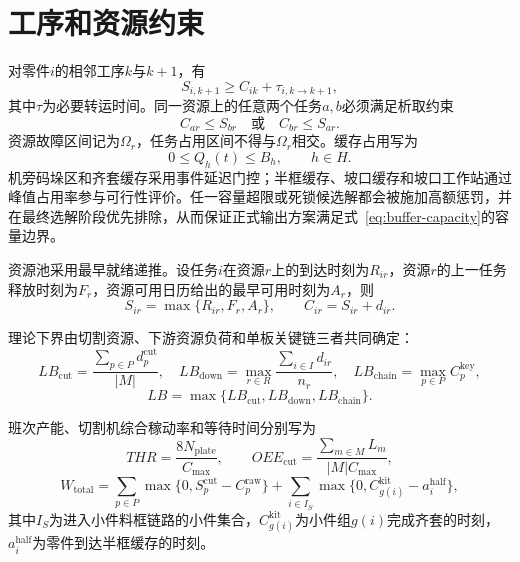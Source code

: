 \documentclass[UTF8,zihao=-4,openany]{ctexrep}
\begin{document}
\section{工序和资源约束}

对零件$i$的相邻工序$k$与$k+1$，有
\begin{equation}
 S_{i,k+1}\ge C_{ik}+\tau_{i,k\rightarrow k+1},
\end{equation}
其中$\tau$为必要转运时间。同一资源上的任意两个任务$a,b$必须满足析取约束
\begin{equation}
 C_{ar}\le S_{br}\quad\text{或}\quad C_{br}\le S_{ar}.
\end{equation}
资源故障区间记为$\Omega_r$，任务占用区间不得与$\Omega_r$相交。缓存占用写为
\begin{equation}
 0\le Q_h(t)\le B_h,\qquad h\in H.\label{eq:buffer-capacity}
\end{equation}
机旁码垛区和齐套缓存采用事件延迟门控；半框缓存、坡口缓存和坡口工作站通过峰值占用率参与可行性评价。任一容量超限或死锁候选解都会被施加高额惩罚，并在最终选解阶段优先排除，从而保证正式输出方案满足式~\eqref{eq:buffer-capacity}的容量边界。

资源池采用最早就绪递推。设任务$i$在资源$r$上的到达时刻为$R_{ir}$，资源$r$的上一任务释放时刻为$F_r$，资源可用日历给出的最早可用时刻为$A_r$，则
\begin{equation}
 S_{ir}=\max\{R_{ir},F_r,A_r\},\qquad C_{ir}=S_{ir}+d_{ir}.
\end{equation}

理论下界由切割资源、下游资源负荷和单板关键链三者共同确定：
\begin{equation}
 LB_{\mathrm{cut}}=\frac{\sum_{p\in P}d_p^{\mathrm{cut}}}{|M|},
 \quad
 LB_{\mathrm{down}}=\max_{r\in R}\frac{\sum_{i\in I}d_{ir}}{n_r},
 \quad
 LB_{\mathrm{chain}}=\max_{p\in P}C_p^{\mathrm{key}},
\end{equation}
\begin{equation}
 LB=\max\{LB_{\mathrm{cut}},LB_{\mathrm{down}},LB_{\mathrm{chain}}\}.
\end{equation}

班次产能、切割机综合稼动率和等待时间分别写为
\begin{equation}
 THR=\frac{8N_{\mathrm{plate}}}{C_{\max}},
 \qquad
 OEE_{\mathrm{cut}}=\frac{\sum_{m\in M}L_m}{|M|C_{\max}},
\end{equation}
\begin{equation}
 W_{\mathrm{total}}
 =\sum_{p\in P}\max\{0,S_p^{\mathrm{cut}}-C_p^{\mathrm{raw}}\}
 +\sum_{i\in I_S}\max\{0,C_{g(i)}^{\mathrm{kit}}-a_i^{\mathrm{half}}\},
\end{equation}
其中$I_S$为进入小件料框链路的小件集合，$C_{g(i)}^{\mathrm{kit}}$为小件组$g(i)$完成齐套的时刻，$a_i^{\mathrm{half}}$为零件到达半框缓存的时刻。
\end{document}
